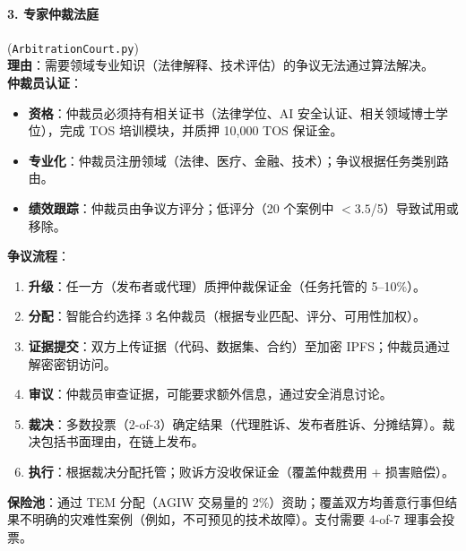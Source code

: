 \documentclass[11pt]{article}
\begin{document}
\paragraph{3. 专家仲裁法庭} (\texttt{ArbitrationCourt.py})\\
\textbf{理由}：需要领域专业知识（法律解释、技术评估）的争议无法通过算法解决。\\
\textbf{仲裁员认证}：
\begin{itemize}[noitemsep]
  \item \textbf{资格}：仲裁员必须持有相关证书（法律学位、AI 安全认证、相关领域博士学位），完成 TOS 培训模块，并质押 10,000 TOS 保证金。
  \item \textbf{专业化}：仲裁员注册领域（法律、医疗、金融、技术）；争议根据任务类别路由。
  \item \textbf{绩效跟踪}：仲裁员由争议方评分；低评分（20 个案例中 $<3.5$/5）导致试用或移除。
\end{itemize}
\textbf{争议流程}：
\begin{enumerate}[noitemsep]
  \item \textbf{升级}：任一方（发布者或代理）质押仲裁保证金（任务托管的 5--10\%）。
  \item \textbf{分配}：智能合约选择 3 名仲裁员（根据专业匹配、评分、可用性加权）。
  \item \textbf{证据提交}：双方上传证据（代码、数据集、合约）至加密 IPFS；仲裁员通过解密密钥访问。
  \item \textbf{审议}：仲裁员审查证据，可能要求额外信息，通过安全消息讨论。
  \item \textbf{裁决}：多数投票（2-of-3）确定结果（代理胜诉、发布者胜诉、分摊结算）。裁决包括书面理由，在链上发布。
  \item \textbf{执行}：根据裁决分配托管；败诉方没收保证金（覆盖仲裁费用 + 损害赔偿）。
\end{enumerate}
\textbf{保险池}：通过 TEM 分配（AGIW 交易量的 2\%）资助；覆盖双方均善意行事但结果不明确的灾难性案例（例如，不可预见的技术故障）。支付需要 4-of-7 理事会投票。
\end{document}

